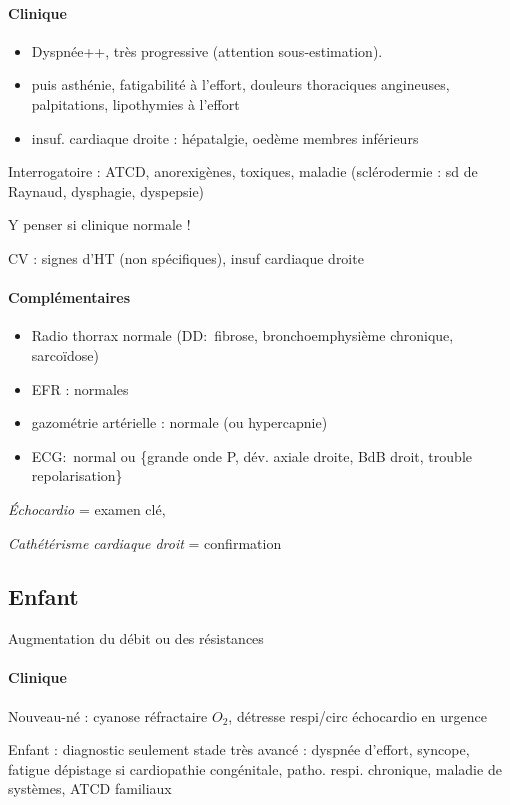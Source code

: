 \paragraph{Clinique}
\begin{itemize}
  \item Dyspnée++, très progressive (attention sous-estimation). 
  \item puis asthénie, fatigabilité à l'effort, douleurs thoraciques angineuses,
    palpitations, lipothymies à l'effort
  \item insuf. cardiaque droite : hépatalgie, oedème membres inférieurs
\end{itemize}
Interrogatoire : ATCD, anorexigènes, toxiques, maladie (sclérodermie : sd de
Raynaud, dysphagie, dyspepsie)

Y penser si clinique normale !

CV : signes d'HT (non spécifiques), insuf cardiaque droite
\paragraph{Complémentaires}
\begin{itemize}
  \item Radio thorrax normale (DD: fibrose, bronchoemphysième chronique,
    sarcoïdose)
  \item EFR : normales
  \item gazométrie artérielle : normale (ou hypercapnie)
  \item ECG: normal ou \{grande onde P, dév. axiale droite, BdB droit, trouble
    repolarisation\}
\end{itemize}
\textit{Échocardio}  = examen clé, 

\textit{Cathétérisme cardiaque droit}  = confirmation

\subsection{Enfant}

Augmentation du débit ou des résistances

\paragraph{Clinique}
Nouveau-né : cyanose réfractaire $O_2$, détresse respi/circ \thus échocardio en
urgence \danger

Enfant : diagnostic seulement stade très avancé : dyspnée d'effort, syncope,
fatigue
\thus dépistage si cardiopathie congénitale, patho. respi. chronique, maladie de
systèmes, ATCD familiaux

